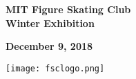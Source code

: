 \documentclass[12pt]{article}
\newcommand{\programnumber}[2]{{
  \vspace{0.1in}
  \textbf{#1}\\
  {\footnotesize #2}
}}
\begin{document}
\begin{multicols*}{2}
\begin{center}

\vspace*{1.5in}

{\Large \textbf{MIT Figure Skating Club}}\\
{\Large \textbf{Winter Exhibition}}

\vspace{0.2in}

{\large\textbf{December 9, 2018}}

\vspace{0.7in}

\texttt{[image: fsclogo.png]}

\end{center}

\vfill\null
\columnbreak



\begin{center}



\end{center}
\end{multicols*}
\end{document}
